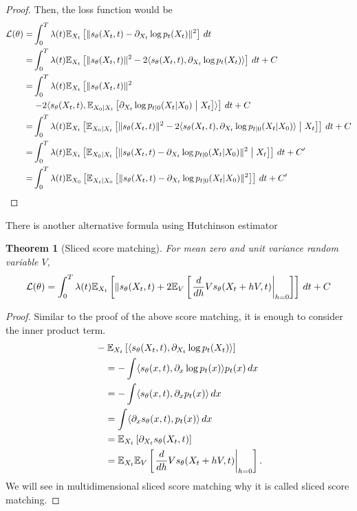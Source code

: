 \documentclass[11pt]{article}
\newtheorem{theorem}{Theorem}
\begin{document}
\begin{proof}
Then, the loss function would be
\begin{align}
    \cL(\theta) =& \int_0^T \lambda(t) \fE_{X_t}\left[ \| s_\theta(X_t, t)  - \partial_{X_t} \log p_t(X_t)\|^2 \right]\, dt\\
    =& \int_0^T \lambda(t) \fE_{X_t}\left[ \| s_\theta(X_t, t) \|^2  - 2 \langle s_\theta(X_t, t), \partial_{X_t} \log p_t(X_t)\rangle \right]\, dt + C\\
    =& \int_0^T \lambda(t) \fE_{X_t}\left[ \| s_\theta(X_t, t) \|^2 \right. \nonumber\\
    &\left.- 2 \langle s_\theta(X_t, t), \fE_{X_0|X_t}\left[\partial_{X_t}  \log p_{t|0}(X_t|X_0)\suchthat X_t\right] \rangle \right]\, dt + C\\
    =& \int_0^T \lambda(t) \fE_{X_t}\left[ \fE_{X_0|X_t}\left[ \| s_\theta(X_t, t) \|^2 
    - 2 \langle s_\theta(X_t, t), \partial_{X_t}  \log p_{t|0}(X_t|X_0) \rangle \suchthat X_t\right]\right]\, dt + C\\
    =& \int_0^T \lambda(t) \fE_{X_t}\left[\fE_{X_0|X_t}\left[ \| s_\theta(X_t, t)  - \partial_{X_t} \log p_{t|0}(X_t|X_0)\|^2 \suchthat X_t\right]\right]\, dt + C'\\
    =& \int_0^T \lambda(t) \fE_{X_0}\left[\fE_{X_t|X_0}\left[ \| s_\theta(X_t, t)  - \partial_{X_t} \log p_{t|0}(X_t|X_0)\|^2 \right]\right]\, dt + C'
\end{align}
\end{proof}


There is another alternative formula using Hutchinson estimator
\begin{theorem}[Sliced score matching]
    For mean zero and unit variance random variable $V$,
    \begin{align}
        {\cal L}(\theta) = \int_0^T \lambda(t) \mathbb{E}_{X_t}\left[ \| s_\theta(X_t, t)  + 2 \mathbb{E}_V\left[\left.\frac{d}{dh} V s_{\theta} (X_t+hV, t)\right|_{h=0}\right]\right]\, dt + C
        \label{eq:sliced matching}
    \end{align}
\end{theorem}
\begin{proof}
    Similar to the proof of the above score matching, it is enough to consider the inner product term.
    \begin{align}
        &-\mathbb{E}_{X_t}\left[\langle s_{\theta}(X_t, t), \partial_{X_t} \log p_t(X_t)\rangle\right] \nonumber\\
        &\quad = -\int\langle s_{\theta}(x, t), \partial_{x} \log p_t(x)\rangle p_t(x)\, dx\\
        &\quad = -\int\langle s_{\theta}(x, t), \partial_{x} p_t(x)\rangle \, dx\\
        &\quad = \int\langle \partial_x s_{\theta}(x, t), p_t(x)\rangle \, dx\\
        &\quad = \mathbb{E}_{X_t}\left[ \partial_{X_t} s_{\theta}(X_t, t)\right] \\
        &\quad = \mathbb{E}_{X_t}\mathbb{E}_V\left[\left.\frac{d}{dh} V s_{\theta} (X_t+hV, t)\right|_{h=0}\right].
    \end{align}
    We will see in multidimensional sliced score matching why it is called sliced score matching.
\end{proof}
\end{document}
